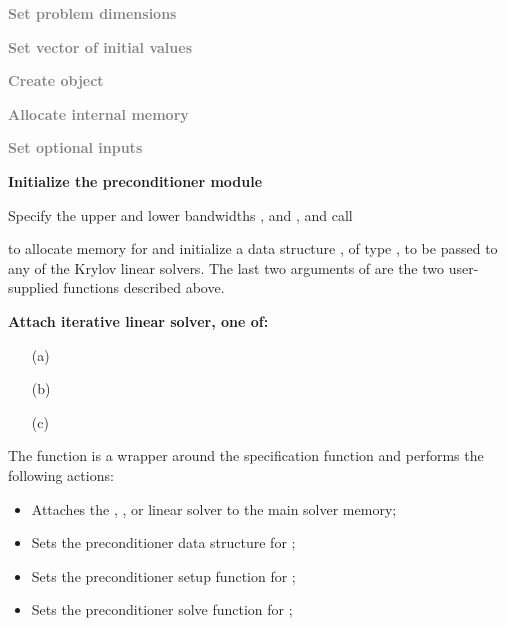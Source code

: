 {\begin{Steps}
\item
  \textcolor{gray}{\bf Set problem dimensions}

\item
  \textcolor{gray}{\bf Set vector of initial values}
 
\item
  \textcolor{gray}{\bf Create {\ida} object}

\item
  \textcolor{gray}{\bf Allocate internal memory}

\item
  \textcolor{gray}{\bf Set optional inputs}

\item \label{i:bbdpre_init}
  {\bf Initialize the {\idabbdpre} preconditioner module}

  Specify the upper and lower bandwidths ,  and
  ,  and call 


  to allocate memory for and initialize a data structure , of type
  , to be passed to any of the Krylov linear solvers. The last two
  arguments of  are the two user-supplied functions described
  above.

\item \label{i:bbdpre_attach}
  {\bf Attach iterative linear solver, one of:}

  \begin{itemize}
  \item[(a) ] 
  \item[(b) ] 
  \item[(c) ] 
  \end{itemize}

  The function  is a wrapper around the specification
  function  and performs the following actions:
  \begin{itemize}
    \item Attaches the {\idaspgmr}, {\idaspbcg}, or {\idasptfqmr} linear solver
     to the main {\ida} solver memory;
    \item Sets the preconditioner data structure for {\idabbdpre};
    \item Sets the preconditioner setup function for {\idabbdpre};
    \item Sets the preconditioner solve function for {\idabbdpre};
  \end{itemize}


\end{Steps}}
